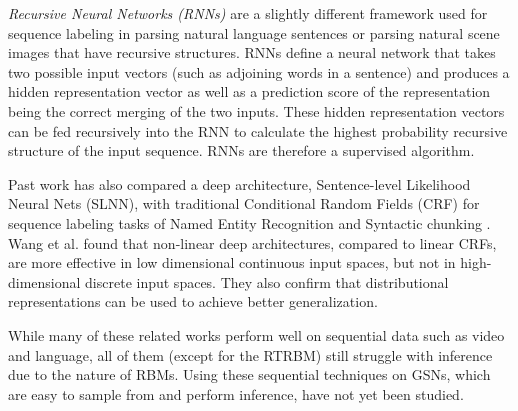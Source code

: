 \emph{Recursive Neural Networks (RNNs)} \cite{socher11} are a slightly different framework used for sequence labeling in parsing natural language sentences or parsing natural scene images that have recursive structures. RNNs define a neural network that takes two possible input vectors (such as adjoining words in a sentence) and produces a hidden representation vector as well as a prediction score of the representation being the correct merging of the two inputs. These hidden representation vectors can be fed recursively into the RNN to calculate the highest probability recursive structure of the input sequence. RNNs are therefore a supervised algorithm.

Past work has also compared a deep architecture, Sentence-level Likelihood Neural Nets (SLNN), with traditional Conditional Random Fields (CRF) for sequence labeling tasks of Named Entity Recognition and Syntactic chunking \cite{wang13}. Wang et al. found that non-linear deep architectures, compared to linear CRFs, are more effective in low dimensional continuous input spaces, but not in high-dimensional discrete input spaces. They also confirm that distributional representations can be used to achieve better generalization.

While many of these related works perform well on sequential data such as video and language, all of them (except for the RTRBM) still struggle with inference due to the nature of RBMs. Using these sequential techniques on GSNs, which are easy to sample from and perform inference, have not yet been studied.